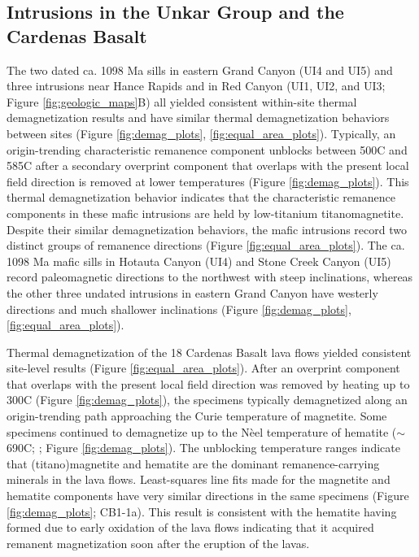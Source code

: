 \subsection*{Intrusions in the Unkar Group and the Cardenas Basalt}
The two dated ca. 1098 Ma sills in eastern Grand Canyon (UI4 and UI5) and three intrusions near Hance Rapids and in Red Canyon (UI1, UI2, and UI3; Figure \ref{fig:geologic_maps}B) all yielded consistent within-site thermal demagnetization results and have similar thermal demagnetization behaviors between sites (Figure \ref{fig:demag_plots}, \ref{fig:equal_area_plots}). Typically, an origin-trending characteristic remanence component unblocks between 500\textdegree C and 585\textdegree C after a secondary overprint component that overlaps with the present local field direction is removed at lower temperatures (Figure \ref{fig:demag_plots}). This thermal demagnetization behavior indicates that the characteristic remanence components in these mafic intrusions are held by low-titanium titanomagnetite. Despite their similar demagnetization behaviors, the mafic intrusions record two distinct groups of remanence directions (Figure \ref{fig:equal_area_plots}). The ca. 1098 Ma mafic sills in Hotauta Canyon (UI4) and Stone Creek Canyon (UI5) record paleomagnetic directions to the northwest with steep inclinations, whereas the other three undated intrusions in eastern Grand Canyon have westerly directions and much shallower inclinations (Figure \ref{fig:demag_plots}, \ref{fig:equal_area_plots}). 

Thermal demagnetization of the 18 Cardenas Basalt lava flows yielded consistent site-level results (Figure \ref{fig:equal_area_plots}). After an overprint component that overlaps with the present local field direction was removed by heating up to 300\textdegree C (Figure \ref{fig:demag_plots}), the specimens typically demagnetized along an origin-trending path approaching the Curie temperature of magnetite. Some specimens continued to demagnetize up to the N\`eel temperature of hematite ($\sim$690\textdegree C; \cite{Ozdemir2006a}; Figure \ref{fig:demag_plots}). The unblocking temperature ranges indicate that (titano)magnetite and hematite are the dominant remanence-carrying minerals in the lava flows. Least-squares line fits made for the magnetite and hematite components have very similar directions in the same specimens (Figure \ref{fig:demag_plots}; CB1-1a). This result is consistent with the hematite having formed due to early oxidation of the lava flows indicating that it acquired remanent magnetization soon after the eruption of the lavas. 

